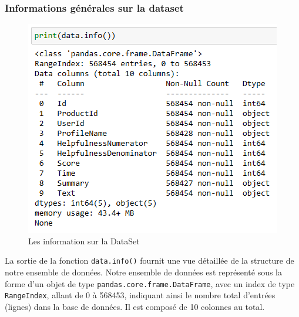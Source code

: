 \subsubsection{Informations générales sur la dataset}
\begin{figure}[h]
    \centering
    \includegraphics[scale=1]{assets/datainfo.PNG}
    \caption{Les information sur la DataSet}
    \label{fig:dataframeinfo}
\end{figure}
\newpage
La sortie de la fonction \texttt{data.info()} fournit une vue détaillée de la structure de notre ensemble de données. Notre ensemble de données est représenté sous la forme d'un objet de type \texttt{pandas.core.frame.DataFrame}, avec un index de type \texttt{RangeIndex}, allant de 0 à 568453, indiquant ainsi le nombre total d'entrées (lignes) dans la base de données. Il est composé de 10 colonnes au total.

